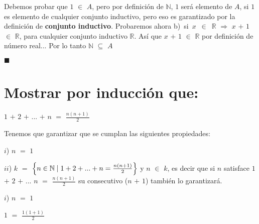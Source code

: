\documentclass[12pt]{article}
\renewcommand{\qedsymbol}{$\blacksquare$}
\newenvironment{MyColorPar}[1]{%
    \leavevmode\color{#1}\ignorespaces%
}{%
}%
\begin{document}
{} \begin{MyColorPar}{verde_manzana}
Debemos probar que $1$ $\in$ $A$, pero por definición de $\mathbb{N}$, $1$ será elemento de $A$, si $1$ es elemento de cualquier conjunto inductivo, pero eso es garantizado por la definición de {\bfseries{conjunto inductivo}}. Probaremos ahora \mbox{b) si $x$ $\in$ $\mathbb{R}$} \hspace{0.2cm} $\Longrightarrow$ \hspace{0.2cm} $x$ $+$ $1$ $\in$ $\mathbb{R}$, para cualquier conjunto inductivo $\mathbb{R}$. Así que $x$ $+$ $1$ $\in$ $\mathbb{R}$ por definición de número real... Por lo tanto $\mathbb{N}$ $\subseteq$ $A$ \vspace{0.1cm} 

\hspace{12cm}\qedsymbol
\end{MyColorPar} \vspace{1cm}


\section{\textsf{Mostrar por inducción que:}} \vspace{0.5cm}

\hspace{3cm} {\LARGE{$1$ $+$ $2$ $+$ ... $+$ $n$ $=$}} {\huge{{$\frac{n(n+1)}{2}$}}} \vspace{0.5cm}

{} \begin{MyColorPar}{verde_manzana}
Tenemos que garantizar que se cumplan las siguientes propiedades:

$i$) $n$ $=$ $1$

$ii$) $k$ $=$ $\left\{ n \in \mathbb{N} \mid 1 + 2 + ... + n = {\Large{\frac{n(n+1)}{2}}} \right\}$ y $n$ $\in$ $k$, es decir que si $n$ satisface $1$ $+$ $2$ $+$ ... $n$ $=$ {\Large{$\frac{n(n+1)}{2}$}} su consecutivo ($n$ $+$ $1$) también lo garantizará.  
\end{MyColorPar} \newpage

$i$) $n$ $=$ $1$ \vspace{0.5cm }

\hspace{5cm} $1$ $=$ {\LARGE{$\frac{1(1+1)}{2}$}} \vspace{0.5cm}
\end{document}
